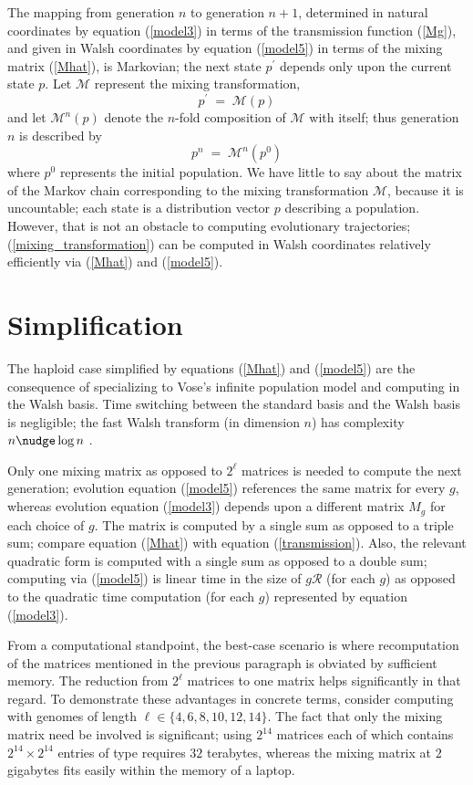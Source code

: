 The mapping from generation $n$ to generation $n+1$, determined in
natural coordinates by equation (\ref{model3}) in terms of the
transmission function (\ref{Mg}), and given in Walsh coordinates by
equation (\ref{model5}) in terms of the mixing matrix (\ref{Mhat}), is
Markovian; the next state $p^\prime$ depends only upon the current
state $p$.  Let $\mathcal{M}$ represent the mixing transformation,
\begin{equation} \label{mixing_transformation}
p^\prime \; = \; \mathcal{M}(p)
\end{equation}
and let $\mathcal{M}^n(p)$ denote the $n$-fold composition of
$\mathcal{M}$ with itself; thus generation $n$ is described by
\[
p^n \; = \; \mathcal{M}^n(p^0)
\]
where $p^0$ represents the initial population.  We have little to say
about the matrix of the Markov chain corresponding to the mixing
transformation $\mathcal{M}$, because it is uncountable; each state is
a distribution vector $p$ describing a population. However, that is
not an obstacle to computing evolutionary trajectories;
(\ref{mixing_transformation}) can be computed in Walsh coordinates
relatively efficiently via (\ref{Mhat}) and (\ref{model5}).

\section{Simplification}
The haploid case simplified by equations (\ref{Mhat}) and (\ref{model5})
are the consequence of specializing to Vose's infinite population model and computing in the Walsh basis. Time switching between the standard basis and the Walsh basis is negligible; the fast Walsh transform (in dimension $n$) has complexity $n \nudge \log n$ \cite{Shanks1969}.

Only one mixing matrix as opposed to $2^\ell$ matrices is needed to compute the next generation; evolution equation (\ref{model5}) references the same matrix for every $g$, whereas evolution equation (\ref{model3}) depends upon a different matrix $M_g$ for each choice of $g$. The matrix is computed by a single sum as opposed to a triple sum; compare equation (\ref{Mhat}) with equation (\ref{transmission}).  Also, the relevant quadratic form is computed with a single sum as opposed to a double sum; computing via (\ref{model5}) is linear time in the size of $g \mathcal{R}$ (for each $g$) as opposed to the quadratic time computation (for each $g$) represented by equation (\ref{model3}).

From a computational standpoint, the best-case scenario is where
recomputation of the matrices mentioned in the previous paragraph is
obviated by sufficient memory.  The reduction from $2^\ell$ matrices
to one matrix helps significantly in that regard. To demonstrate these advantages in concrete terms, consider computing
with genomes of length $\ell \in \{4,6,8,10,12,14\}$.  The fact that
only the mixing matrix need be involved is significant; using $2^{14}$
matrices each of which contains $2^{14} \times 2^{14}$ entries of type
\verb@double@ requires $32$ terabytes, whereas the mixing matrix at
$2$ gigabytes fits easily within the memory of a laptop.


